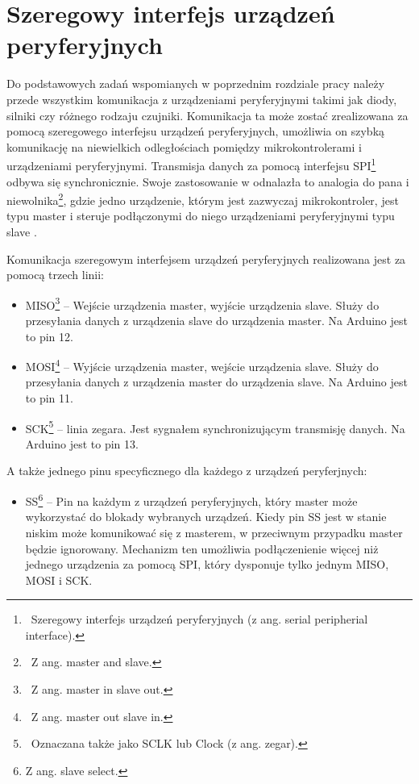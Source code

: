 \documentclass[12pt]{report}
\begin{document}
\section{Szeregowy interfejs urządzeń peryferyjnych}

Do podstawowych zadań wspomianych w poprzednim rozdziale pracy należy przede wszystkim komunikacja z urządzeniami peryferyjnymi takimi jak diody, silniki czy różnego rodzaju czujniki. Komunikacja ta może zostać zrealizowana za pomocą szeregowego interfejsu urządzeń peryferyjnych, umożliwia on szybką komunikację na niewielkich odległościach pomiędzy mikrokontrolerami i urządzeniami peryferyjnymi. Transmisja danych za pomocą interfejsu SPI\footnote{~Szeregowy interfejs urządzeń peryferyjnych (z ang. serial peripherial interface).} odbywa się synchronicznie. Swoje zastosowanie w odnalazła to analogia do pana i niewolnika\footnote{~Z ang. master and slave.}, gdzie jedno urządzenie, którym jest zazwyczaj mikrokontroler, jest typu master i steruje podłączonymi do niego urządzeniami peryferyjnymi typu slave \cite{arduinostr}. 

Komunikacja szeregowym interfejsem urządzeń peryferyjnych realizowana jest za pomocą trzech linii:

\begin{itemize}
	\item MISO\footnote{~Z ang. master in slave out.} -- Wejście urządzenia master, wyjście urządzenia slave. Służy do przesyłania danych z urządzenia slave do urządzenia master. Na Arduino jest to pin 12.
	\item MOSI\footnote{~Z ang. master out slave in.} -- Wyjście urządzenia master, wejście urządzenia slave. Służy do przesyłania danych z urządzenia master do urządzenia slave. Na Arduino jest to pin 11.
	\item SCK\footnote{~Oznaczana także jako SCLK lub Clock (z ang. zegar).} -- linia zegara. Jest sygnałem synchronizującym transmisję danych. Na Arduino jest to pin 13.
\end{itemize}

A także jednego pinu specyficznego dla każdego z urządzeń peryferjnych:

\begin{itemize}
	\item SS\footnote{Z ang. slave select.} -- Pin na każdym z urządzeń peryferyjnych, który master może wykorzystać do blokady wybranych urządzeń. Kiedy pin SS jest w stanie niskim może komunikować się z masterem, w przeciwnym przypadku master będzie ignorowany. Mechanizm ten umożliwia podłączenienie więcej niż jednego urządzenia za pomocą SPI, który dysponuje tylko jednym MISO, MOSI i SCK.
\end{itemize}
\end{document}
